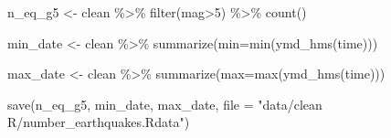 \documentclass[
  letterpaper,
  DIV=11,
  numbers=noendperiod]{scrartcl}
\newenvironment{Shaded}{\begin{snugshade}}{\end{snugshade}}
\newcommand{\AttributeTok}[1]{\textcolor[rgb]{0.40,0.45,0.13}{#1}}
\newcommand{\DecValTok}[1]{\textcolor[rgb]{0.68,0.00,0.00}{#1}}
\newcommand{\FunctionTok}[1]{\textcolor[rgb]{0.28,0.35,0.67}{#1}}
\newcommand{\NormalTok}[1]{\textcolor[rgb]{0.00,0.23,0.31}{#1}}
\newcommand{\OtherTok}[1]{\textcolor[rgb]{0.00,0.23,0.31}{#1}}
\newcommand{\SpecialCharTok}[1]{\textcolor[rgb]{0.37,0.37,0.37}{#1}}
\newcommand{\StringTok}[1]{\textcolor[rgb]{0.13,0.47,0.30}{#1}}
\begin{document}
\begin{Shaded}
\begin{Highlighting}[]
\NormalTok{n\_eq\_g5 }\OtherTok{\textless{}{-}}\NormalTok{ clean }\SpecialCharTok{\%\textgreater{}\%} \FunctionTok{filter}\NormalTok{(mag}\SpecialCharTok{\textgreater{}}\DecValTok{5}\NormalTok{) }\SpecialCharTok{\%\textgreater{}\%} \FunctionTok{count}\NormalTok{()}

\NormalTok{min\_date }\OtherTok{\textless{}{-}}\NormalTok{ clean }\SpecialCharTok{\%\textgreater{}\%} \FunctionTok{summarize}\NormalTok{(}\AttributeTok{min=}\FunctionTok{min}\NormalTok{(}\FunctionTok{ymd\_hms}\NormalTok{(time)))}


\NormalTok{max\_date }\OtherTok{\textless{}{-}}\NormalTok{ clean }\SpecialCharTok{\%\textgreater{}\%} \FunctionTok{summarize}\NormalTok{(}\AttributeTok{max=}\FunctionTok{max}\NormalTok{(}\FunctionTok{ymd\_hms}\NormalTok{(time)))}

\FunctionTok{save}\NormalTok{(n\_eq\_g5, min\_date, max\_date, }
     \AttributeTok{file =} \StringTok{"data/clean R/number\_earthquakes.Rdata"}\NormalTok{)}
\end{Highlighting}
\end{Shaded}
\end{document}
